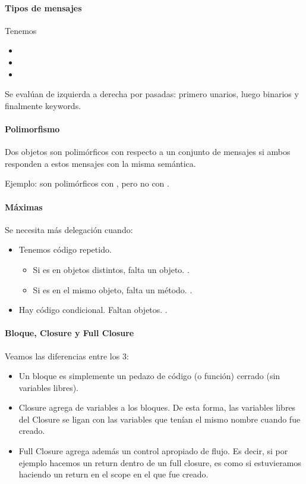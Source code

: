 \paragraph{Tipos de mensajes}

Tenemos
\begin{itemize}
  \item {}
  \item {}
  \item {}
\end{itemize}

Se evalúan de izquierda a derecha por pasadas: primero unarios, luego binarios y finalmente keywords.

\paragraph{Polimorfismo}

Dos objetos son polimórficos con respecto a un conjunto de mensajes si ambos responden a estos mensajes con la misma semántica.

Ejemplo:  son polimórficos con , pero no con .

\paragraph{Máximas}

Se necesita más delegación cuando:
\begin{itemize}
  \item Tenemos código repetido.
    \begin{itemize}
      \item Si es en objetos distintos, falta un objeto. .
      \item Si es en el mismo objeto, falta un método. .
    \end{itemize}
  \item Hay código condicional. Faltan objetos. .
\end{itemize}

\paragraph{Bloque, Closure y Full Closure}

Veamos las diferencias entre los 3:

\begin{itemize}
  \item Un bloque es simplemente un pedazo de código (o función) cerrado (sin variables libres).
  \item Closure agrega  de variables a los bloques. De esta forma, las variables libres del Closure se ligan con las variables que tenían el mismo nombre cuando fue creado.
  \item Full Closure agrega además un control apropiado de flujo. Es decir, si por ejemplo hacemos un return dentro de un full closure, es como si estuvieramos haciendo un return en el scope en el que fue creado.
\end{itemize}

